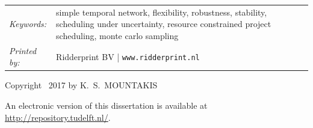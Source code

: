\begin{titlepage}
\vfill

\noindent
\begin{tabular}{@{}p{}@{}p{}}
	\textit{Keywords:} & {simple temporal network, flexibility, robustness, stability, scheduling under uncertainty, resource constrained project scheduling, monte carlo sampling} \\[\medskipamount]
	 \textit{Printed by:} & \textrm{Ridderprint BV} | \texttt{www.ridderprint.nl}
\end{tabular}

\vspace{4\bigskipamount}

\noindent Copyright \textcopyright\ 2017 by K.~S.~MOUNTAKIS



\medskip
\noindent An electronic version of this dissertation is available at \\
\url{http://repository.tudelft.nl/}.

\end{titlepage}

